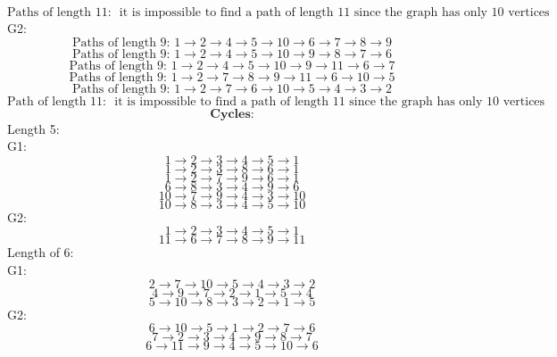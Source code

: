 \documentclass[a3paper,12pt]{extarticle} %
\begin{document}
\begin{enumerate}
\[    \]
    \[
        \text{Paths of length 11: } \text{ it is impossible to find a path of length 11 since the graph has only 10 vertices and we can only have a path of length 9 (n -1  )}
    \]
    G2:
    \[
        \text{Paths of length 9: } 1 \rightarrow 2 \rightarrow 4 \rightarrow 5 \rightarrow 10 \rightarrow 6 \rightarrow 7 \rightarrow 8 \rightarrow 9
    \]
    \[
        \text{Paths of length 9: } 1 \rightarrow 2 \rightarrow 4 \rightarrow 5 \rightarrow 10 \rightarrow 9 \rightarrow 8 \rightarrow 7 \rightarrow 6
    \]
    \[
        \text{Paths of length 9: } 1 \rightarrow 2 \rightarrow 4 \rightarrow 5 \rightarrow 10 \rightarrow 9 \rightarrow 11 \rightarrow 6 \rightarrow 7
    \]
    \[
        \text{Paths of length 9: } 1 \rightarrow 2 \rightarrow 7 \rightarrow 8 \rightarrow 9 \rightarrow 11 \rightarrow 6 \rightarrow 10 \rightarrow 5
    \]
    \[
        \text{Paths of length 9: } 1 \rightarrow 2 \rightarrow 7 \rightarrow 6 \rightarrow 10 \rightarrow 5 \rightarrow 4 \rightarrow 3 \rightarrow 2
    \]
    \[
        \text{Path of length 11: } \text{ it is impossible to find a path of length 11 since the graph has only 10 vertices and we can only have a path of length 9 (n -1  )}
    \]
    \[
    \textbf{Cycles:}
    \]
    Length 5:
    \\ G1:
    \[
        1 \rightarrow 2 \rightarrow 3 \rightarrow 4 \rightarrow 5 \rightarrow 1
    \]
    \[
        1 \rightarrow 2 \rightarrow 3 \rightarrow 8 \rightarrow 6 \rightarrow 1
    \]
    \[
        1 \rightarrow 2 \rightarrow 7 \rightarrow 9 \rightarrow 6 \rightarrow 1
    \]
    \[
        6 \rightarrow 8 \rightarrow 3 \rightarrow 4 \rightarrow 9 \rightarrow 6
    \]
    \[
        10 \rightarrow 7 \rightarrow 9 \rightarrow 4 \rightarrow 3 \rightarrow 10
    \]
    \[
        10 \rightarrow 8 \rightarrow 3 \rightarrow 4 \rightarrow 5 \rightarrow 10
    \]
    G2:
    \[
        1 \rightarrow 2 \rightarrow 3 \rightarrow 4 \rightarrow 5 \rightarrow 1    
    \]
    \[
        11 \rightarrow 6 \rightarrow 7 \rightarrow 8 \rightarrow 9 \rightarrow 11
    \]
    Length of 6:
    \\ G1:
    \[
        2 \rightarrow 7 \rightarrow 10 \rightarrow 5 \rightarrow 4 \rightarrow 3 \rightarrow 2
    \]
    \[
        4 \rightarrow 9 \rightarrow 7 \rightarrow 2 \rightarrow 1 \rightarrow 5 \rightarrow 4
    \]
    \[
        5 \rightarrow 10 \rightarrow 8 \rightarrow 3 \rightarrow 2 \rightarrow 1 \rightarrow 5
    \]
    G2:
    \[
        6 \rightarrow 10 \rightarrow 5 \rightarrow 1 \rightarrow 2 \rightarrow 7 \rightarrow 6
    \]
    \[
        7 \rightarrow 2 \rightarrow 3 \rightarrow 4 \rightarrow 9 \rightarrow 8 \rightarrow 7
    \]
    \[
        6 \rightarrow 11 \rightarrow 9 \rightarrow 4 \rightarrow 5 \rightarrow 10 \rightarrow 6
    \]


\end{enumerate}
\end{document}
